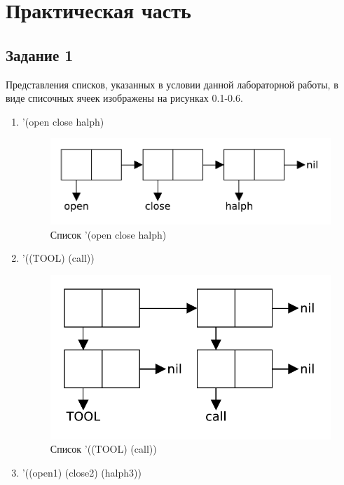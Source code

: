 \chapter{Практическая часть}

\section{Задание \No{}1}
Представления списков, указанных в условии данной лабораторной работы, в виде списочных ячеек изображены на рисунках 0.1-0.6.

\begin{enumerate}
    \item '(open close halph)
        \begin{figure}[H]
            \centering
            \includegraphics[scale=0.75]{data/pdf/01-01.pdf}
            \caption{Список '(open close halph)}
        \end{figure}
    \item '((TOOL) (call))
        \begin{figure}[H]
            \centering
            \includegraphics[scale=0.75]{data/pdf/01-02.pdf}
            \caption{Список '((TOOL) (call))}
        \end{figure}
    \item '((open1) (close2) (halph3))
        \begin{figure}[H]

\end{figure}
\end{enumerate}
